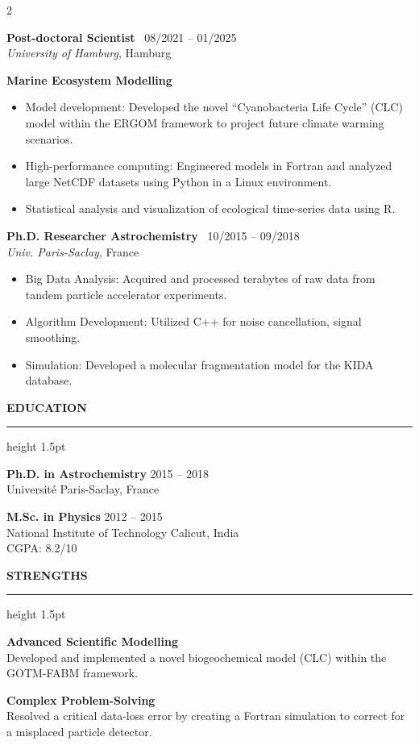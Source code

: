 \documentclass[11pt,a4paper]{article}
\newcommand{\sectiontitle}[1]{
    \vspace{0.3cm}
    {\large \bfseries \color{maincol} \MakeUppercase{#1}}
    \vspace{0.1cm}
    {\color{maincol} \hrule height 1.5pt}
    \vspace{0.2cm}
}
\newcommand{\jobitem}[4]{
    \noindent
    \textbf{#1} \hfill {\footnotesize \faCalendar* \ #4} \\
    {\color{lighttextcol} \textit{#2}, #3}
    \vspace{0.1cm}
}
\begin{document}
\begin{paracol}{2}
    \jobitem{Post-doctoral Scientist}{University of Hamburg}{Hamburg}{08/2021 -- 01/2025}
    \textbf{Marine Ecosystem Modelling}
    \begin{itemize}[leftmargin=*,noitemsep,topsep=0pt,label=\textcolor{maincol}{\tiny\faCircle}]
        \item Model development: Developed the novel ``Cyanobacteria Life Cycle'' (CLC) model within the ERGOM framework to project future climate warming scenarios.
        \item High-performance computing: Engineered models in Fortran and analyzed large NetCDF datasets using Python in a Linux environment.
        \item Statistical analysis and visualization of ecological time-series data using R.
    \end{itemize}
    
    \jobitem{Ph.D. Researcher Astrochemistry}{Univ. Paris-Saclay}{France}{10/2015 -- 09/2018}
    \begin{itemize}[leftmargin=*,noitemsep,topsep=0pt,label=\textcolor{maincol}{\tiny\faCircle}]
        \item Big Data Analysis: Acquired and processed terabytes of raw data from tandem particle accelerator experiments.
        \item Algorithm Development: Utilized C++ for noise cancellation, signal smoothing.
        \item Simulation: Developed a molecular fragmentation model for the KIDA database.
    \end{itemize}
    
    \sectiontitle{Education}
    \textbf{Ph.D. in Astrochemistry} \hfill 2015 -- 2018 \\
    Universit\'e Paris-Saclay, France
    
    \vspace{0.2cm}
    \textbf{M.Sc. in Physics} \hfill 2012 -- 2015 \\
    National Institute of Technology Calicut, India \\
    CGPA: 8.2/10


\switchcolumn[1] 
    
    \sectiontitle{Strengths}
    
    \textbf{Advanced Scientific Modelling} \\
    Developed and implemented a novel biogeochemical model (CLC) within the GOTM-FABM framework.
    
    \vspace{0.2cm}
    \textbf{Complex Problem-Solving} \\
    Resolved a critical data-loss error by creating a Fortran simulation to correct for a misplaced particle detector.
    

\end{paracol}
\end{document}
